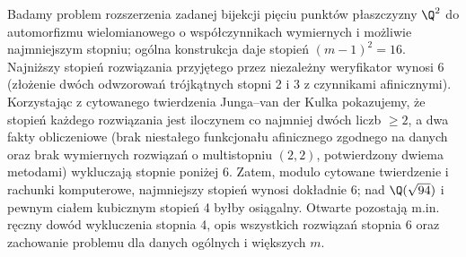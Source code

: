 Badamy problem rozszerzenia zadanej bijekcji pięciu punktów płaszczyzny $\Q^2$ do automorfizmu
wielomianowego o współczynnikach wymiernych i możliwie najmniejszym stopniu; ogólna konstrukcja
daje stopień $(m-1)^2=16$. Najniższy stopień rozwiązania przyjętego przez niezależny weryfikator
wynosi $6$ (złożenie dwóch odwzorowań trójkątnych stopni 2 i 3 z czynnikami afinicznymi).
Korzystając z cytowanego twierdzenia Junga--van der Kulka pokazujemy, że stopień każdego
rozwiązania jest iloczynem co najmniej dwóch liczb $\ge2$, a dwa fakty obliczeniowe (brak
niestałego funkcjonału afinicznego zgodnego na danych oraz brak wymiernych rozwiązań o
multistopniu $(2,2)$, potwierdzony dwiema metodami) wykluczają stopnie poniżej 6.
Zatem, modulo cytowane twierdzenie i rachunki komputerowe, najmniejszy stopień wynosi dokładnie 6;
nad $\Q(\sqrt{94})$ i pewnym ciałem kubicznym stopień 4 byłby osiągalny.
Otwarte pozostają m.in. ręczny dowód wykluczenia stopnia 4, opis wszystkich rozwiązań stopnia 6
oraz zachowanie problemu dla danych ogólnych i większych $m$.
